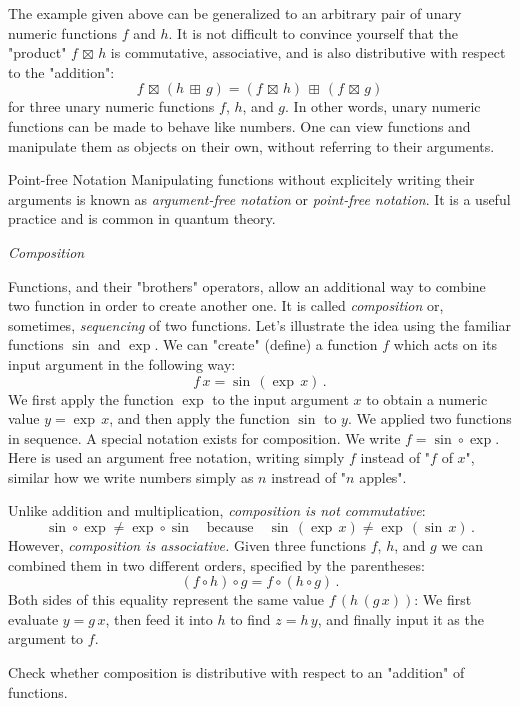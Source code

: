 The example given above can be generalized to an arbitrary pair of unary numeric functions $f$ and $h$. It is not difficult to convince yourself that the "product" $f\,\boxtimes\, h$ is commutative, associative, and is also distributive with respect to the "addition":
\[
f\,\boxtimes\, (h\,\boxplus\, g) = (f\,\boxtimes\, h)\,\boxplus\,(f\,\boxtimes\, g)
\]
for three unary numeric functions $f$, $h$, and $g$. In other words, unary numeric functions can be made to behave like numbers. One can view functions and manipulate them as objects on their own, without referring to their arguments.
\begin{mybio}{Point-free Notation}
	Manipulating functions without explicitely writing their arguments is known as \emph{argument-free notation} or \emph{point-free notation}. It is a useful practice and is common in quantum theory.
\end{mybio}

\begin{flushleft}
	{\it Composition}
\end{flushleft}
Functions, and their "brothers" operators, allow an additional way to combine two function in order to create another one. It is called \emph{composition} or, sometimes, \emph{sequencing} of two functions. Let's illustrate the idea using the familiar functions $\sin$ and $\exp$. We can "create" (define) a function 
$f$ which acts on its input argument in the following way:
\[
f\,x=\sin\,(\exp\, x)\,.
\]
We first apply the function $\exp$ to the input argument $x$ to obtain a numeric value $y=\exp\, x$, and then apply the function $\sin$ to $y$. We applied two functions in sequence. A special notation exists for composition. We write $f = \sin\circ\exp$. Here is used an argument free notation, writing simply $f$ instead of "$f$ of $x$", similar how we write numbers simply as $n$ instread of "$n$ apples".

Unlike addition and multiplication, \emph{composition is not commutative}:
\[
\sin\circ\exp\ne\exp\circ\sin\quad\textrm{because}\quad\sin\,(\exp\, x) \ne \exp\,(\sin\, x)\,.
\]
However, \emph{composition is associative.} Given three functions $f$, $h$, and $g$ we can combined them in two different orders, specified by the parentheses:
\[
(f\circ h)\circ g = f\circ(h\circ g)\,.
\]
Both sides of this equality represent the same value $f\,(h\, (g\, x))$: We first evaluate $y=g\, x$, then feed it into $h$ to find $z=h\,y$, and finally input it as the argument to $f$.

\begin{exercise}
	Check whether composition is distributive with respect to an "addition" of functions.
\end{exercise}

